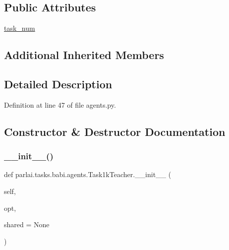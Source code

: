 \subsection*{Public Attributes}
\begin{DoxyCompactItemize}
\item 
\hyperlink{classparlai_1_1tasks_1_1babi_1_1agents_1_1Task1kTeacher_a0c153d5823837de445669016a18540e7}{task\+\_\+num}
\end{DoxyCompactItemize}
\subsection*{Additional Inherited Members}


\subsection{Detailed Description}


Definition at line 47 of file agents.\+py.



\subsection{Constructor \& Destructor Documentation}
\mbox{\label{classparlai_1_1tasks_1_1babi_1_1agents_1_1Task1kTeacher_a61a5955ca556265eaf2e47a33c80ef09}} 
\subsubsection{\texorpdfstring{\+\_\+\+\_\+init\+\_\+\+\_\+()}{\_\_init\_\_()}}
{\footnotesize\ttfamily def parlai.\+tasks.\+babi.\+agents.\+Task1k\+Teacher.\+\_\+\+\_\+init\+\_\+\+\_\+ (\begin{DoxyParamCaption}\item[{}]{self,  }\item[{}]{opt,  }\item[{}]{shared = {\ttfamily None} }\end{DoxyParamCaption})}



